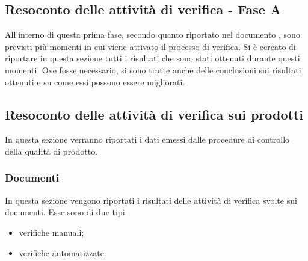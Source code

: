 \documentclass[../PianoDiQualifica.tex]{subfiles}
\begin{document}
\begin{appendices}
\section{Resoconto delle attività di verifica - Fase A}
All'interno di questa prima fase, secondo quanto riportato nel documento \pianodiprogettov, sono previsti più momenti in cui viene attivato il processo di verifica. Si è cercato di riportare in questa sezione tutti i risultati che sono stati ottenuti durante questi momenti. Ove fosse necessario, si sono tratte anche delle conclusioni sui risultati ottenuti e su come essi possono essere migliorati.
	\subsection{Resoconto delle attività di verifica sui prodotti}
	In questa sezione verranno riportati i dati emessi dalle procedure di controllo della qualità di prodotto.
		\subsubsection{Documenti}
		In questa sezione vengono riportati i risultati delle attività di verifica svolte sui documenti. Esse sono di due tipi:
		\begin{itemize}
			\item verifiche manuali;
			\item verifiche automatizzate.
		\end{itemize}

\end{appendices}
\end{document}
